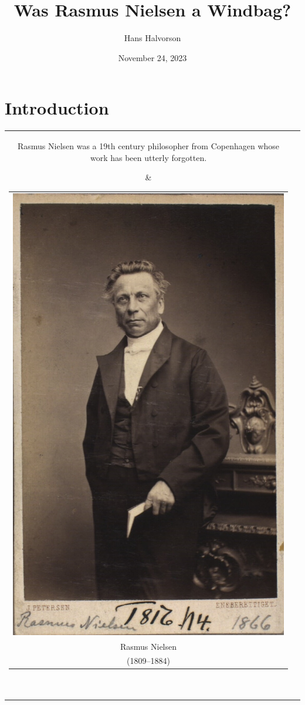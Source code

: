 \documentclass[ignorenonframetext, ]{beamer}
\title{Was Rasmus Nielsen a Windbag?}
\author{Hans Halvorson}
\date{November 24, 2023}
\begin{document}
\frame{\titlepage}

\section{Introduction}

\begin{frame}

  \begin{tabular}{cc}
            \parbox[b]{0.5\linewidth}{ %
      Rasmus Nielsen was a 19th century philosopher from Copenhagen
      whose work has been utterly forgotten.
      } 
      &          \begin{tabular}{c}
                   \includegraphics[scale=0.45]{nielsen-small.jpg} \\
                   {\small Rasmus Nielsen } \\
                   {\small (1809--1884) }
           \end{tabular}  \\
  \end{tabular}


\end{frame}
\end{document}
